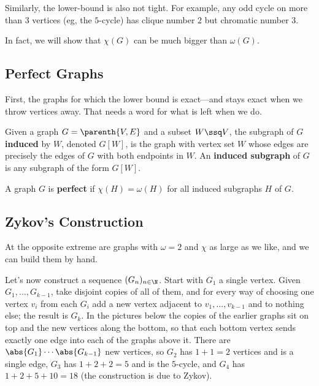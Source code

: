 Similarly, the lower-bound is also not tight. For example, any odd cycle on more than $3$ vertices (eg, the $5$-cycle) has clique number $2$ but chromatic number $3$.

\begin{figure}[H]
    \centering
\end{figure}

In fact, we will show that $\chi(G)$ can be much bigger than $\omega(G)$.

\subsection{Perfect Graphs}

First, the graphs for which the lower bound is exact---and stays exact when we throw vertices away. That needs a word for what is left when we do.

\begin{boxdefinition}
    Given a graph $G = \parenth{V, E}$ and a subset $W \ssq V$, the subgraph of $G$ \textbf{induced} by $W$, denoted $G[W]$, is the graph with vertex set $W$ whose edges are precisely the edges of $G$ with both endpoints in $W$. An \textbf{induced subgraph} of $G$ is any subgraph of the form $G[W]$.
\end{boxdefinition}

\begin{boxdefinition}
    A graph $G$ is \textbf{perfect} if $\chi(H) = \omega(H)$ for all induced subgraphs $H$ of $G$.
\end{boxdefinition}

\subsection{Zykov's Construction}

At the opposite extreme are graphs with $\omega = 2$ and $\chi$ as large as we like, and we can build them by hand.

Let's now construct a sequence $(G_n)_{n \in \N}$. Start with $G_1$ a single vertex. Given $G_1, \ldots, G_{k-1}$, take disjoint copies of all of them, and for every way of choosing one vertex $v_i$ from each $G_i$ add a new vertex adjacent to $v_1, \ldots, v_{k-1}$ and to nothing else; the result is $G_k$. In the pictures below the copies of the earlier graphs sit on top and the new vertices along the bottom, so that each bottom vertex sends exactly one edge into each of the graphs above it. There are $\abs{G_1} \cdots \abs{G_{k-1}}$ new vertices, so $G_2$ has $1 + 1 = 2$ vertices and is a single edge, $G_3$ has $1 + 2 + 2 = 5$ and is the $5$-cycle, and $G_4$ has $1 + 2 + 5 + 10 = 18$ (the construction is due to Zykov).

